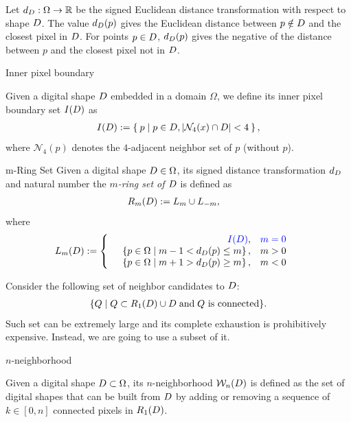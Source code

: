 Let $d_{D}:\Omega \rightarrow \mathbb{R}$ be the signed Euclidean distance transformation with respect to shape $D$. The value $d_{D}(p)$ gives the Euclidean distance between $p \notin D$ and the closest pixel in $D$. For points $p \in D$, $d_{D}(p)$ gives the negative of the distance between $p$ and the closest pixel not in $D$.
\begin{definition}{Inner pixel boundary}

Given a digital shape $D$ embedded in a domain $\Omega$, we define its inner pixel boundary set $I(D)$ as
\begin{align*}
	I(D) := \left\{ \: p \; | \; p \in D, |\mathcal{N}_4(x) \cap D|<4 \: \right\},
\end{align*}
where $\mathcal{N}_4(p)$ denotes the $4$-adjacent neighbor set of $p$ (without $p$). 
\end{definition}
\begin{definition}{m-Ring Set}
Given a digital shape $D \in\Omega$, its signed distance transformation $d_{D}$ and natural number  %
the {\em $m$-ring set of $D$} is defined as
\begin{align*}
	R_m(D) &:= L_m \cup L_{-m},
\end{align*}
where
\begin{align*}
	L_m(D) &:= \left\{ \quad \begin{array}{rc}
		{\color{blue}{I(D)}}, & {\color{blue}{m=0}}\\
		\left\{ p \in \Omega \; | \; m-1 < d_{D}(p) \leq m \right\}, &  m>0\\
		\left\{ p \in \Omega \; | \; m+1 > d_{D}(p) \geq m \right\}, &  m<0
		\end{array} \right.
\end{align*}
\end{definition}
 Consider the following set of neighbor candidates to $D$:
\begin{align*}
\{ Q \; | \; Q \subset R_1(D) \cup D \; \text{and} \; \text{$Q$ is connected} \}.
\end{align*}
Such set can be extremely large and its complete exhaustion is prohibitively expensive.  Instead, we are going to use a subset of it.
\begin{definition}{$n$-neighborhood}

	Given a digital shape $D \subset \Omega$, its $n$-neigh\-bor\-hood $\mathcal{W}_n(D)$ is defined as the set of digital shapes that can be built from $D$ by adding or removing a sequence of $k \in [0,n]$ connected pixels in $R_1(D)$.

\end{definition}

